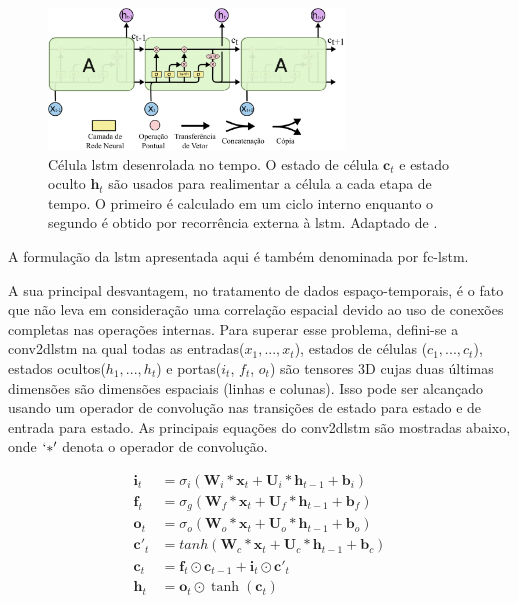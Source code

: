 \begin{figure}[h]
	\centering
	\includegraphics[width=0.7\textwidth]{figuras/lstm_no_tempo.pdf}
	\caption[Célula \acrshort{lstm} no tempo]{Célula \acrshort{lstm} desenrolada no tempo. O estado de célula $\textbf{c}_{t}$ e estado oculto $\textbf{h}_{t}$ são usados para realimentar a célula a cada etapa de tempo. O primeiro é calculado em um ciclo interno enquanto o segundo é obtido por recorrência externa à \acrshort{lstm}. Adaptado de \cite{Olah}.}
	\label{fig:lstm_time}
\end{figure}

A formulação da \acrshort{lstm} apresentada aqui é também denominada por \gls{fc-lstm}.

A sua principal desvantagem, no tratamento de dados espaço-temporais, é o fato que não leva em consideração uma correlação espacial devido ao uso de conexões completas nas operações internas.  
Para superar esse problema, defini-se a \gls{conv2dlstm} \cite{xingjian2015convolutional,FullResolution2017Toderici} na qual todas as entradas($x_1,..., x_t$), estados de células ($c_1,..., c_t$), estados ocultos($h_1,..., h_t$) e portas($i_t$, $f_t$, $o_t$) são tensores 3D cujas duas últimas dimensões são dimensões espaciais (linhas e colunas). Isso pode ser alcançado usando um operador de convolução nas transições de estado para estado e de entrada para estado. As principais equações do \acrshort{conv2dlstm} são mostradas abaixo, onde $`\ast'$ denota o operador de convolução.

\begin{equation}
\label{eq:conlstm}
\begin{aligned}
\textbf{i}_t &= \sigma_{i}(\textbf{W}_i*\textbf{x}_t + \textbf{U}_i*\textbf{h}_{t-1} + \textbf{b}_i) \\
\textbf{f}_t &= \sigma_{g}(\textbf{W}_f*\textbf{x}_t + \textbf{U}_f*\textbf{h}_{t-1} + \textbf{b}_f) \\
\textbf{o}_t &= \sigma_{o}(\textbf{W}_o*\textbf{x}_t + \textbf{U}_o*\textbf{h}_{t-1} + \textbf{b}_o) \\   
\textbf{c}'_t &= tanh(\textbf{W}_c*\textbf{x}_t + \textbf{U}_c*\textbf{h}_{t-1} + \textbf{b}_c) \\
\textbf{c}_t &= \textbf{f}_t \odot \textbf{c}_{t-1} + \textbf{i}_t \odot \textbf{c}'_t \\
\textbf{h}_t & = \textbf{o}_t \odot \tanh(\textbf{c}_t)  
\end{aligned}
\end{equation}

